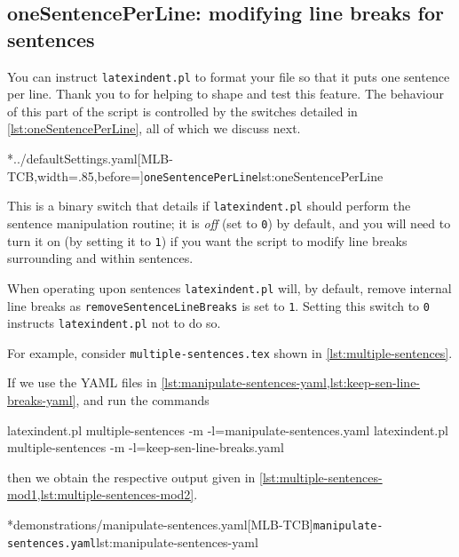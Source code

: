 \subsection{oneSentencePerLine: modifying line breaks for sentences}\label{sec:onesentenceperline}
	You can instruct \texttt{latexindent.pl} to
	format%
	 your file so that
	it puts one sentence per line. Thank you to \cite{mlep} for helping to
	shape and test this feature. The behaviour of this part of the script is controlled by
	the switches detailed in \cref{lst:oneSentencePerLine}, all of which we discuss next.

	\cmhlistingsfromfile[style=oneSentencePerLine]*{../defaultSettings.yaml}[MLB-TCB,width=.85\linewidth,before=\centering]{\texttt{oneSentencePerLine}}{lst:oneSentencePerLine}

	This is a binary switch that details if \texttt{latexindent.pl} should perform the
	sentence manipulation routine; it is \emph{off} (set to \texttt{0}) by default, and you will
	need to turn it on (by setting it to \texttt{1}) if you want the script
	to modify line breaks surrounding and within sentences.

	When operating upon sentences \texttt{latexindent.pl} will, by default, remove
	internal line breaks as \texttt{removeSentenceLineBreaks} is set to
	\texttt{1}. Setting this switch to \texttt{0} instructs
	\texttt{latexindent.pl} not to do so.

	For example, consider \texttt{multiple-sentences.tex} shown in \cref{lst:multiple-sentences}.


	If we use the YAML files in \cref{lst:manipulate-sentences-yaml,lst:keep-sen-line-breaks-yaml}, and run the commands
	\begin{widepage}
		\begin{commandshell}
latexindent.pl multiple-sentences -m -l=manipulate-sentences.yaml
latexindent.pl multiple-sentences -m -l=keep-sen-line-breaks.yaml
\end{commandshell}
	\end{widepage}
	then we obtain the respective output given in \cref{lst:multiple-sentences-mod1,lst:multiple-sentences-mod2}.

	\begin{cmhtcbraster}
		\cmhlistingsfromfile[style=yaml-LST]*{demonstrations/manipulate-sentences.yaml}[MLB-TCB]{\texttt{manipulate-sentences.yaml}}{lst:manipulate-sentences-yaml}
	\end{cmhtcbraster}

